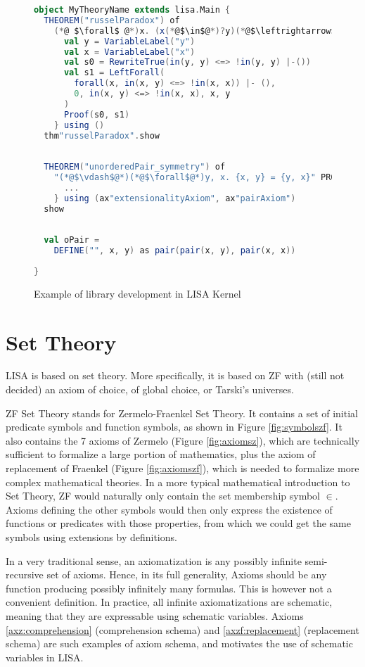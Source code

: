 \begin{figure}[hp]
\begin{lstlisting}[language=Scala, frame=single]
object MyTheoryName extends lisa.Main {
  THEOREM("russelParadox") of 
    (*@ $\forall$ @*)x. (x(*@$\in$@*)?y)(*@$\leftrightarrow$@*) (*@$\neg$@*)(x(*@$\in$@*)x)(*@$\vdash$@*) PROOF {
      val y = VariableLabel("y")
      val x = VariableLabel("x")
      val s0 = RewriteTrue(in(y, y) <=> !in(y, y) |-())
      val s1 = LeftForall(
        forall(x, in(x, y) <=> !in(x, x)) |- (),
        0, in(x, y) <=> !in(x, x), x, y
      )
      Proof(s0, s1)
    } using ()
  thm"russelParadox".show
  
  
  THEOREM("unorderedPair_symmetry") of
    "(*@$\vdash$@*)(*@$\forall$@*)y, x. {x, y} = {y, x}" PROOF {
      ...
    } using (ax"extensionalityAxiom", ax"pairAxiom")
  show
  
  
  val oPair = 
    DEFINE("", x, y) as pair(pair(x, y), pair(x, x))
  
}
\end{lstlisting}
\caption{Example of library development in LISA Kernel}
\label{fig:kernellibrary}
\end{figure}





\chapter{Set Theory}
\label{chapt:settheory}
LISA is based on set theory. More specifically, it is based on ZF with (still not decided) an axiom of choice, of global choice, or Tarski's universes.

ZF Set Theory stands for Zermelo-Fraenkel Set Theory. It contains a set of initial predicate symbols and function symbols, as shown in Figure \ref{fig:symbolszf}. It also contains the 7 axioms of Zermelo (Figure \ref{fig:axiomsz}), which are technically sufficient to formalize a large portion of mathematics, plus the axiom of replacement of Fraenkel (Figure \ref{fig:axiomszf}), which is needed to formalize more complex mathematical theories. 
In a more typical mathematical introduction to Set Theory, ZF would naturally only contain the set membership symbol $\in$. Axioms defining the other symbols would then only express the existence of functions or predicates with those properties, from which we could get the same symbols using extensions by definitions.

In a very traditional sense, an axiomatization is any possibly infinite semi-recursive set of axioms. Hence, in its full generality, Axioms should be any function producing possibly infinitely many formulas.
This is however not a convenient definition. In practice, all infinite axiomatizations are schematic, meaning that they are expressable using schematic variables. Axioms \ref{axz:comprehension} (comprehension schema) and \ref{axzf:replacement} (replacement schema) are such examples of axiom schema, and motivates the use of schematic variables in LISA.



